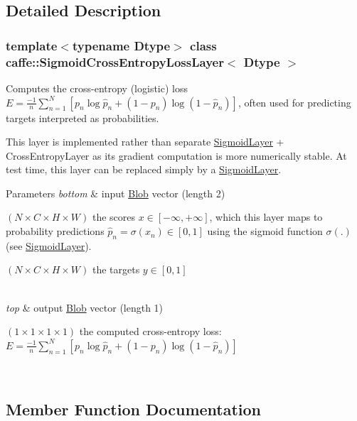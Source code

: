 \subsection{Detailed Description}
\subsubsection*{template$<$typename Dtype$>$\newline
class caffe\+::\+Sigmoid\+Cross\+Entropy\+Loss\+Layer$<$ Dtype $>$}

Computes the cross-\/entropy (logistic) loss $ E = \frac{-1}{n} \sum\limits_{n=1}^N \left[ p_n \log \hat{p}_n + (1 - p_n) \log(1 - \hat{p}_n) \right] $, often used for predicting targets interpreted as probabilities. 

This layer is implemented rather than separate \mbox{\hyperlink{classcaffe_1_1_sigmoid_layer}{Sigmoid\+Layer}} + Cross\+Entropy\+Layer as its gradient computation is more numerically stable. At test time, this layer can be replaced simply by a \mbox{\hyperlink{classcaffe_1_1_sigmoid_layer}{Sigmoid\+Layer}}.


\begin{DoxyParams}{Parameters}
{\em bottom} & input \mbox{\hyperlink{classcaffe_1_1_blob}{Blob}} vector (length 2)
\begin{DoxyEnumerate}
\item $ (N \times C \times H \times W) $ the scores $ x \in [-\infty, +\infty]$, which this layer maps to probability predictions $ \hat{p}_n = \sigma(x_n) \in [0, 1] $ using the sigmoid function $ \sigma(.) $ (see \mbox{\hyperlink{classcaffe_1_1_sigmoid_layer}{Sigmoid\+Layer}}).
\item $ (N \times C \times H \times W) $ the targets $ y \in [0, 1] $ 
\end{DoxyEnumerate}\\
\hline
{\em top} & output \mbox{\hyperlink{classcaffe_1_1_blob}{Blob}} vector (length 1)
\begin{DoxyEnumerate}
\item $ (1 \times 1 \times 1 \times 1) $ the computed cross-\/entropy loss\+: $ E = \frac{-1}{n} \sum\limits_{n=1}^N \left[ p_n \log \hat{p}_n + (1 - p_n) \log(1 - \hat{p}_n) \right] $ 
\end{DoxyEnumerate}\\
\hline
\end{DoxyParams}


\subsection{Member Function Documentation}
\mbox{\label{classcaffe_1_1_sigmoid_cross_entropy_loss_layer_a025360b1de1fefbc4684e43603394a22}} 
